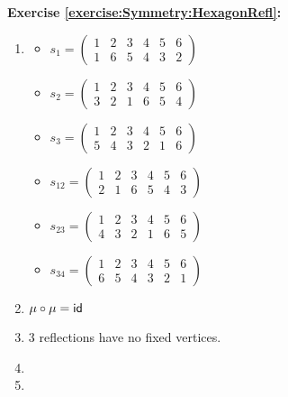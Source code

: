 \noindent\textbf{Exercise \ref{exercise:Symmetry:HexagonRefl}:}
\begin{enumerate}[{a.}]
\item
	\begin{multicols}{2}
	\begin{itemize}
	\item
	$s_1=\begin{pmatrix}
	1 & 2 & 3 & 4 & 5 & 6\\
	1 & 6 & 5 & 4 & 3 & 2
	\end{pmatrix}$

	\item
	$s_2=\begin{pmatrix}
	1 & 2 & 3 & 4 & 5 & 6\\
	3 & 2 & 1 & 6 & 5 & 4
	\end{pmatrix}$

	\item
	$s_3=\begin{pmatrix}
	1 & 2 & 3 & 4 & 5 & 6\\
	5 & 4 & 3 & 2 & 1 & 6
	\end{pmatrix}$
	
	\item
	$s_{12}=\begin{pmatrix}
	1 & 2 & 3 & 4 & 5 & 6\\
	2 & 1 & 6 & 5 & 4 & 3
	\end{pmatrix}$


	\item
	$s_{23}=\begin{pmatrix}
	1 & 2 & 3 & 4 & 5 & 6\\
	4 & 3 & 2 & 1 & 6 & 5
	\end{pmatrix}$
	
	\item
	$s_{34}=\begin{pmatrix}
	1 & 2 & 3 & 4 & 5 & 6\\
	6 & 5 & 4 & 3 & 2 & 1
	\end{pmatrix}$
	\end{itemize}
	\end{multicols}
	
\item
$\mu\circ\mu = \sf{id}$

\item
3 reflections have no fixed vertices.

\item

\item

\end{enumerate}

